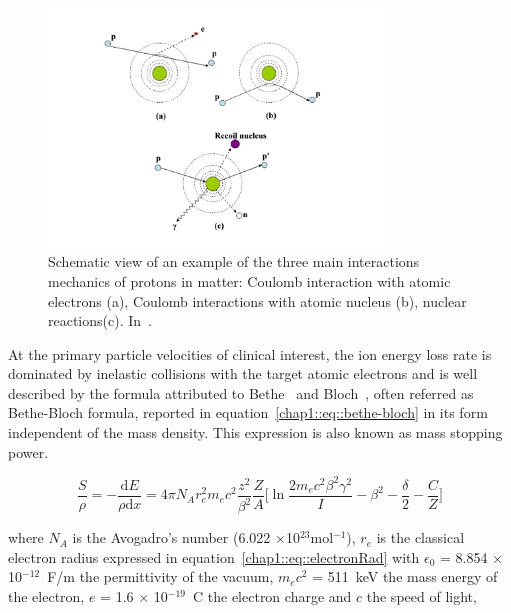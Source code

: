\begin{figure}[!htbp]
\centering
\includegraphics[width=0.8\textwidth]{03_GraphicFiles/chapter1_Introduction/protonInteractions.pdf}
\caption{Schematic view of an example of the three main interactions mechanics of protons in matter: Coulomb interaction with atomic electrons (a), Coulomb interactions with atomic nucleus (b), nuclear reactions(c). In~\cite{Newhauser2015}.}
\label{chap1::fig::protInteractions}
\end{figure} 

At the primary particle velocities of clinical interest,   the ion energy loss rate is dominated by inelastic collisions with the target atomic electrons and is well described by the formula attributed to Bethe~\parencite{Bethe1930} and Bloch~\parencite{Bloch1933}, often referred as Bethe-Bloch formula, reported in equation~\ref{chap1::eq::bethe-bloch} in its form independent of the mass density. This expression is also known as mass stopping power.

\begin{equation}
\frac{S}{\rho} = -\frac{\mathrm{d}E}{\rho \mathrm{d}x} = 4\pi N_{A}r^{2}_{e}m_{e}c^{2}\frac{z^{2}}{\beta^{2}}\frac{Z}{A}\bigg[\ln{\frac{2m_{e}c^{2}\beta^{2}\gamma^{2}}{I}}-\beta^{2}-\frac{\delta}{2}-\frac{C}{Z}\bigg]
\label{chap1::eq::bethe-bloch}
\end{equation}

where $N_{A}$ is the Avogadro's number (6.022 $\times$10$^{23}$mol$^{-1}$), $r_{e}$ is the classical electron radius expressed in equation~\ref{chap1::eq::electronRad} with $\epsilon_{0}$ = 8.854 $\times$ 10$^{-12}$~F/m the permittivity of the vacuum, $m_{e}c^{2}$ = 511~keV the mass energy of the electron, $e$ = 1.6 $\times$ 10$^{-19}$~C the electron charge and $c$ the speed of light,  


